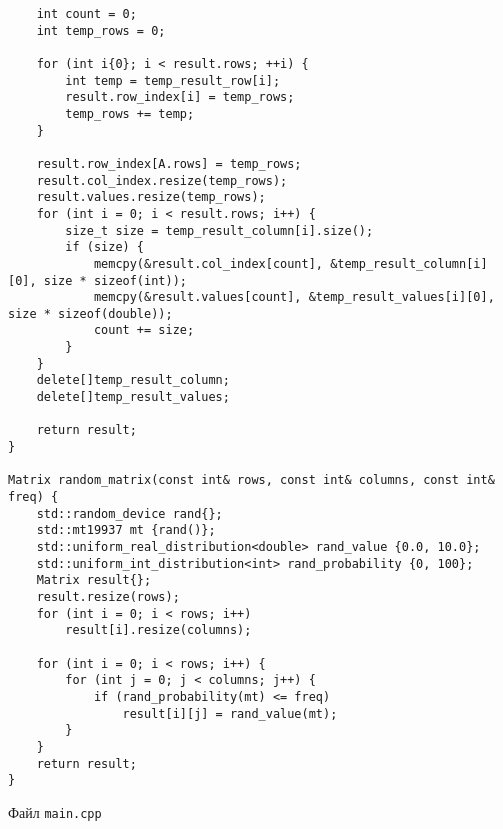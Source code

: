 \documentclass{report}
\begin{document}
\begin{lstlisting}
    int count = 0;
    int temp_rows = 0;

    for (int i{0}; i < result.rows; ++i) {
        int temp = temp_result_row[i];
        result.row_index[i] = temp_rows;
        temp_rows += temp;
    }

    result.row_index[A.rows] = temp_rows;
    result.col_index.resize(temp_rows);
    result.values.resize(temp_rows);
    for (int i = 0; i < result.rows; i++) {
        size_t size = temp_result_column[i].size();
        if (size) {
            memcpy(&result.col_index[count], &temp_result_column[i][0], size * sizeof(int));
            memcpy(&result.values[count], &temp_result_values[i][0], size * sizeof(double));
            count += size;
        }
    }
    delete[]temp_result_column;
    delete[]temp_result_values;

    return result;
}

Matrix random_matrix(const int& rows, const int& columns, const int& freq) {
    std::random_device rand{};
    std::mt19937 mt {rand()};
    std::uniform_real_distribution<double> rand_value {0.0, 10.0};
    std::uniform_int_distribution<int> rand_probability {0, 100};
    Matrix result{};
    result.resize(rows);
    for (int i = 0; i < rows; i++)
        result[i].resize(columns);

    for (int i = 0; i < rows; i++) {
        for (int j = 0; j < columns; j++) {
            if (rand_probability(mt) <= freq)
                result[i][j] = rand_value(mt);
        }
    }
    return result;
}

\end{lstlisting}
Файл \verb|main.cpp|
\end{document}
